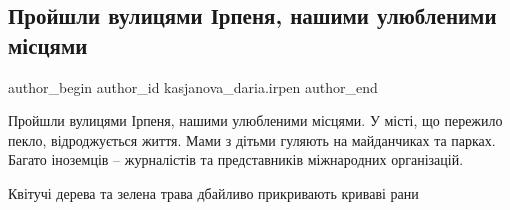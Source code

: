  
 
 
 
 
 
\subsection{Пройшли вулицями Ірпеня, нашими улюбленими місцями}
\label{sec:13_05_2022.fb.kasjanova_daria.irpen.1.ulicy_irpin}
 
\ifcmt
 author_begin
   author_id kasjanova_daria.irpen
 author_end
\fi

Пройшли вулицями Ірпеня, нашими улюбленими місцями. У місті, що пережило пекло,
відроджується життя. Мами з дітьми гуляють на майданчиках та парках. Багато
іноземців – журналістів та представників міжнародних організацій.  


Квітучі дерева та зелена трава дбайливо прикривають криваві рани

